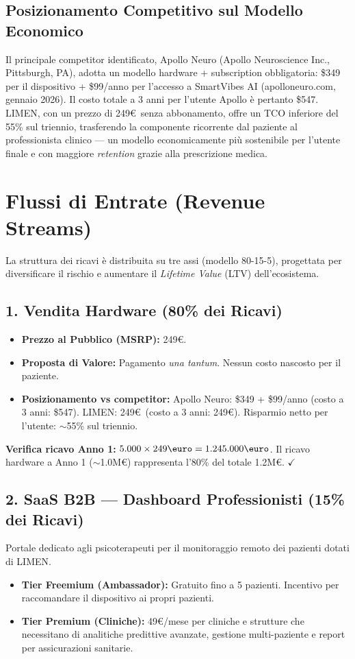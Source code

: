 \documentclass[12pt,a4paper]{article}
\begin{document}
\subsection{Posizionamento Competitivo sul Modello Economico}
Il principale competitor identificato, Apollo Neuro (Apollo Neuroscience Inc., Pittsburgh, PA), adotta un modello hardware + subscription obbligatoria: \$349 per il dispositivo + \$99/anno per l'accesso a SmartVibes AI (apolloneuro.com, gennaio 2026). Il costo totale a 3 anni per l'utente Apollo è pertanto \$547. LIMEN, con un prezzo di 249\euro\ senza abbonamento, offre un TCO inferiore del 55\% sul triennio, trasferendo la componente ricorrente dal paziente al professionista clinico --- un modello economicamente più sostenibile per l'utente finale e con maggiore \textit{retention} grazie alla prescrizione medica.

\section{Flussi di Entrate (Revenue Streams)}
La struttura dei ricavi è distribuita su tre assi (modello 80-15-5), progettata per diversificare il rischio e aumentare il \textit{Lifetime Value} (LTV) dell'ecosistema.

\subsection{1. Vendita Hardware (80\% dei Ricavi)}
\begin{itemize}
    \item \textbf{Prezzo al Pubblico (MSRP):} 249\euro.
    \item \textbf{Proposta di Valore:} Pagamento \textit{una tantum}. Nessun costo nascosto per il paziente.
    \item \textbf{Posizionamento vs competitor:} Apollo Neuro: \$349 + \$99/anno (costo a 3 anni: \$547). LIMEN: 249\euro\ (costo a 3 anni: 249\euro). Risparmio netto per l'utente: $\sim$55\% sul triennio.
\end{itemize}

\textbf{Verifica ricavo Anno 1:} $5.000 \times 249\text{\euro} = 1.245.000\text{\euro}$. Il ricavo hardware a Anno 1 ($\sim$1.0M\euro) rappresenta l'80\% del totale 1.2M\euro. $\checkmark$

\subsection{2. SaaS B2B --- Dashboard Professionisti (15\% dei Ricavi)}
Portale dedicato agli psicoterapeuti per il monitoraggio remoto dei pazienti dotati di LIMEN.
\begin{itemize}
    \item \textbf{Tier Freemium (Ambassador):} Gratuito fino a 5 pazienti. Incentivo per raccomandare il dispositivo ai propri pazienti.
    \item \textbf{Tier Premium (Cliniche):} 49\euro/mese per cliniche e strutture che necessitano di analitiche predittive avanzate, gestione multi-paziente e report per assicurazioni sanitarie.
\end{itemize}
\end{document}
